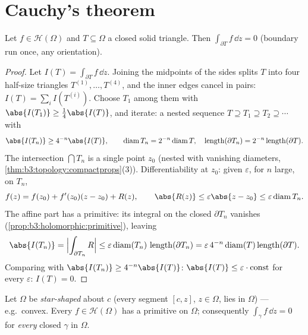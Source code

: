 \section{Cauchy's theorem}

\begin{theorem}[Goursat]\label{thm:b3:holomorphic:goursat}
Let $f \in \mathcal H(\Omega)$ and $T \subseteq \Omega$ a
closed solid triangle. Then $\int_{\partial T}f\,\dd z = 0$
(boundary run once, any orientation).
\end{theorem}

\begin{proof}
Let $I(T) = \int_{\partial T}f\,\dd z$. Joining the midpoints
of the sides splits $T$ into four half-size triangles $T^{(1)},
\dots, T^{(4)}$, and the inner edges cancel in pairs: $I(T) =
\sum_iI(T^{(i)})$. Choose $T_1$ among them with
$\abs{I(T_1)} \geq \frac14\abs{I(T)}$, and iterate: a nested
sequence $T \supseteq T_1 \supseteq T_2 \supseteq\cdots$ with
\[
\abs{I(T_n)} \geq 4^{-n}\abs{I(T)},
\qquad
\operatorname{diam}T_n = 2^{-n}\operatorname{diam}T,
\quad
\operatorname{length}(\partial T_n) =
2^{-n}\operatorname{length}(\partial T).
\]
The intersection $\bigcap T_n$ is a single point $z_0$
(nested  with vanishing diameters,
\cref{thm:b3:topology:compactprops}(3)). Differentiability at
$z_0$: given $\varepsilon$, for $n$ large, on $T_n$,
\[
f(z) = f(z_0) + f'(z_0)(z - z_0) + R(z),
\qquad \abs{R(z)} \leq \varepsilon\abs{z - z_0} \leq
\varepsilon\operatorname{diam}T_n .
\]
The affine part has a primitive: its integral on the closed
$\partial T_n$ vanishes (\cref{prop:b3:holomorphic:primitive}),
leaving
\[
\abs{I(T_n)} = \Bigl|\int_{\partial T_n}R\Bigr|
\leq \varepsilon\operatorname{diam}(T_n)\,
\operatorname{length}(\partial T_n)
= \varepsilon\,4^{-n}\operatorname{diam}(T)
\operatorname{length}(\partial T) .
\]
Comparing with $\abs{I(T_n)} \geq 4^{-n}\abs{I(T)}$:
$\abs{I(T)} \leq \varepsilon\cdot\text{const}$ for every
$\varepsilon$: $I(T) = 0$.
\end{proof}

\begin{theorem}
\label{thm:b3:holomorphic:cauchy}
Let $\Omega$ be \emph{star-shaped} about $c$ (every segment
$[c, z]$, $z \in \Omega$, lies in $\Omega$) --- e.g.\ convex.
Every $f \in \mathcal H(\Omega)$ has a primitive on $\Omega$;
consequently $\int_\gamma f\,\dd z = 0$ for \emph{every}
closed  $\gamma$ in $\Omega$.
\end{theorem}

